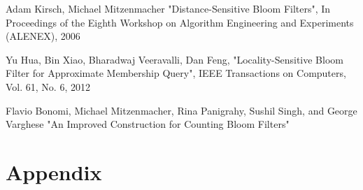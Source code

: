 \documentclass[a4paper,11pt]{article}
\begin{document}
\begin{thebibliography}{}

Adam Kirsch, Michael Mitzenmacher
"Distance-Sensitive Bloom Filters", In Proceedings of the Eighth Workshop on Algorithm Engineering and Experiments (ALENEX), 2006

Yu Hua, Bin Xiao, Bharadwaj Veeravalli, Dan Feng, "Locality-Sensitive Bloom Filter for Approximate Membership Query", IEEE Transactions on Computers, Vol. 61, No. 6, 2012


Flavio Bonomi, Michael Mitzenmacher, Rina Panigrahy, Sushil Singh, and George Varghese
"An Improved Construction for Counting Bloom Filters"

\end{thebibliography}

\section*{Appendix}
\appendix
\end{document}
